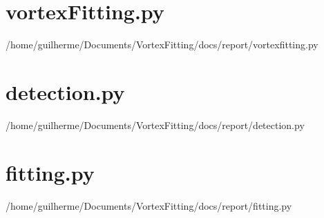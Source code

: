 \documentclass[12pt, a4paper, openany]{memoir}
\begin{document}
\section{vortexFitting.py}


{/home/guilherme/Documents/VortexFitting/docs/report/vortexfitting.py}

\section{detection.py}


{/home/guilherme/Documents/VortexFitting/docs/report/detection.py}

\section{fitting.py}


{/home/guilherme/Documents/VortexFitting/docs/report/fitting.py}
\end{document}
